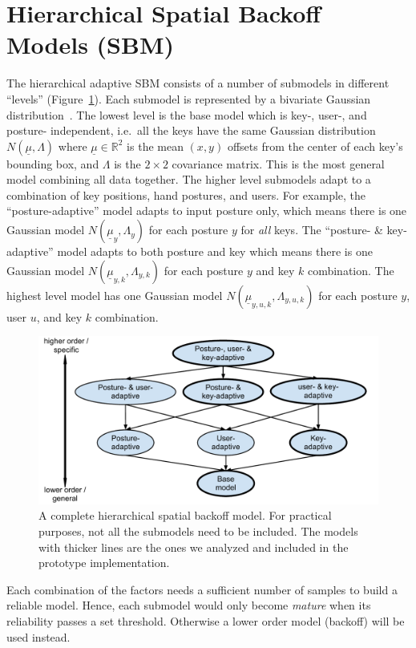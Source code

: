 \documentclass{sigchi}
\begin{document}
\section{Hierarchical Spatial Backoff Models (SBM)}
The hierarchical adaptive SBM consists of a number of submodels in different
``levels'' (Figure~\ref{fig:hierarchy}). Each submodel is represented by a
bivariate Gaussian distribution~\cite{Azenkot:2012,
Goodman:2002, Rashid:2008}.
The lowest level is the base model which is key-, user-, and posture-
independent, i.e.\ all the keys have the same Gaussian
distribution $N(\underline\mu, \Lambda)$ where $\underline\mu \in \mathbb{R}^2$ is the mean
$(x, y)$ offsets from the center of each key's bounding box, and $\Lambda$ is
the $2\times 2$ covariance matrix. This is the most general model combining all 
data together. The higher level submodels adapt to a combination of key
positions,  hand postures, and users. For example, the ``posture-adaptive''
model adapts to input posture only, which means there is one Gaussian  model
$N(\underline\mu_y, \Lambda_y)$ for each posture $y$ for \textit{all} keys.  The
``posture- \& key-adaptive'' model adapts to both posture and key which means 
there is one Gaussian model $N(\underline\mu_{y, k}, \Lambda_{y, k})$ for each posture $y$ and key $k$ combination.  The highest level model has one Gaussian model $N(\underline\mu_{y,u,k}, \Lambda_{y,u,k})$ for each posture $y$, user $u$, and key $k$ combination.

\begin{figure}[tb]
  \centering
  \includegraphics[width=0.9\columnwidth]{figures/hierarchy.pdf}
  \caption{A complete hierarchical spatial backoff model. For practical purposes, not all the submodels need to be included. The models with thicker lines are the ones we analyzed and included in the prototype implementation.}
  \label{fig:hierarchy}
\end{figure}

Each combination of the factors needs a sufficient number of samples to build a 
reliable model. Hence, each submodel would only become \textit{mature} when its reliability passes a set threshold. Otherwise a lower order model (backoff) will be used instead.
\end{document}
